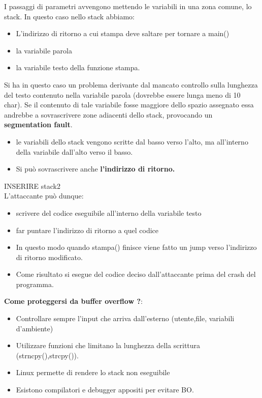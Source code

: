 \documentclass[12pt]{article}
\begin{document}
				I passaggi di parametri avvengono mettendo le variabili in una zona comune, lo stack. In questo caso nello stack abbiamo:
				\begin{itemize}
					\item L'indirizzo di ritorno a cui stampa deve saltare per tornare a main()
					\item la variabile parola 
					\item la variabile testo della funzione stampa.
				\end{itemize}
				Si ha in questo caso un problema derivante dal mancato controllo sulla lunghezza del testo contenuto nella variabile parola (dovrebbe essere lunga meno di 10 char). Se il contenuto di tale variabile fosse maggiore dello spazio assegnato essa andrebbe a sovrascrivere zone adiacenti dello stack, provocando un \textbf{segmentation fault}.
				\begin{itemize}
					\item le variabili dello stack vengono scritte dal basso verso l'alto, ma all'interno della variabile dall'alto verso il basso.
					\item Si può sovrascrivere anche \textbf{l'indirizzo di ritorno.}
				\end{itemize}
			
				INSERIRE stack2\\
				
				L'attaccante può dunque:
				\begin{itemize}
					\item scrivere del codice eseguibile all'interno della variabile testo 
					\item far puntare l'indirizzo di ritorno a quel codice
					\item In questo modo quando stampa() finisce viene fatto un jump verso l'indirizzo di ritorno modificato.
					\item Come risultato si esegue del codice deciso dall'attaccante prima del crash del programma.
				\end{itemize}
				\textbf{Come proteggersi da buffer overflow ?}:
				\begin{itemize}
					\item Controllare sempre l'input che arriva dall'esterno (utente,file, variabili d'ambiente) 
					\item Utilizzare funzioni che limitano la lunghezza della scrittura (strncpy(),strcpy()).
					\item  Linux permette di rendere lo stack non eseguibile
					\item Esistono compilatori e debugger appositi per evitare BO.
				\end{itemize}
			
\end{document}
